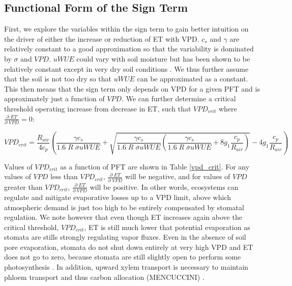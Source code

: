 \documentclass[draft,linenumbers]{agujournal}
\begin{document}
\subsection{Functional Form of the Sign Term}
\label{sign_func}
First, we explore the variables within the sign term to gain better intuition on the driver of either the increase or reduction of ET with VPD. $c_s$ and $\gamma$ are relatively constant to a good approximation so that the variability is dominated by $\sigma$ and $VPD$. $uWUE$ could vary with soil moisture but has been shown to be relatively constant except in very dry soil conditions \citep{Zhou_2016, Lin_2015}. We thus further assume that the soil is not too dry so that $uWUE$ can be approximated as a constant. This then means that the sign term only depends on VPD for a given PFT and is approximately just a function of $VPD$. We can further determine a critical threshold operating increase from decrease in ET, such that $VPD_{crit}$ where $\frac{\partial \; ET}{\partial \; VPD} = 0$:

\begin{linenomath*}
  \begin{equation}
VPD_{crit} = \frac{R_{air}}{4 c_p} \left( \frac{\gamma c_s}{1.6\; R \; \overline{\sigma} uWUE} + \sqrt{\frac{\gamma c_s}{1.6\; R \; \overline{\sigma} uWUE}\left( \frac{\gamma c_s}{1.6\; R \; \overline{\sigma} uWUE} + 8 g_1 \frac{c_p}{R_{air}}\right)} - 4 g_1 \frac{c_p}{R_{air}} \right)
\label{vpd_min_et}
  \end{equation}
\end{linenomath*}

Values of $VPD_{crit}$ as a function of PFT are shown in Table \ref{vpd_crit}. For any values of $VPD$ less than $VPD_{crit}$, $\frac{\partial \; ET}{\partial \; VPD}$ will be negative, and for values of $VPD$ greater than $VPD_{crit}$, $\frac{\partial \; ET}{\partial \; VPD}$ will be positive. In other words, ecosystems can regulate and mitigate evaporative losses up to a VPD limit, above which atmospheric demand is just too high to be entirely compensated by stomatal regulation. We note however that even though ET increases again above the critical threshold, $VPD_{crit}$, ET is still much lower that potential evaporation as stomata are stills strongly regulating vapor fluxes. Even in the absence of soil pore evaporation, stomata do not shut down entirely at very high VPD and ET does not go to zero, because stomata are still slightly open to perform some photosynthesis \citep{Ball_1987, Leuning_1990, Medlyn_2011}. In addition, upward xylem transport is necessary to maintain phloem transport and thus carbon allocation (MENCUCCINI) .
\end{document}
